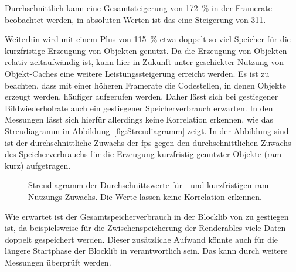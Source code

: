 Durchschnittlich kann eine Gesamtsteigerung von \SI{172}{\percent} in der Framerate beobachtet werden, in absoluten Werten ist das eine Steigerung von \SI{311}{\fps}.

Weiterhin wird mit einem Plus von \SI{115}{\percent} etwa doppelt so viel Speicher für die kurzfristige Erzeugung von Objekten genutzt. Da die Erzeugung von Objekten relativ zeitaufwändig ist, kann hier in Zukunft unter geschickter Nutzung von Objekt-Caches eine weitere Leistungssteigerung erreicht werden. Es ist zu beachten, dass mit einer höheren Framerate die Codestellen, in denen Objekte erzeugt werden, häufiger aufgerufen werden. Daher lässt sich bei gestiegener Bildwiederholrate auch ein gestiegener Speicherverbrauch erwarten. In den Messungen lässt sich hierfür allerdings keine Korrelation erkennen, wie das Streudiagramm in Abbildung~\vref{fig:Streudiagramm} zeigt. In der Abbildung sind ist der durchschnittliche Zuwachs der \ac{fps} gegen den durchschnittlichen Zuwachs des Speicherverbrauchs für die Erzeugung kurzfristig genutzter Objekte (\ac{ram} kurz) aufgetragen. 
\begin{figure}
	\centering
		\caption[Streudiagramm der Durchschnittswerte für - und kurzfristigen -Nutzungs-Zuwachs.]{Streudiagramm der Durchschnittswerte für \si{\fps}- und kurzfristigen \ac{ram}-Nutzungs-Zuwachs. Die Werte lassen keine Korrelation erkennen.}\label{fig:Streudiagramm}
\end{figure}

Wie erwartet ist der Gesamtspeicherverbrauch in der Blocklib von \sysA{} zu \sysB{} gestiegen ist, da beispielsweise für die Zwischenspeicherung der Renderables viele Daten doppelt gespeichert werden. 
Dieser zusätzliche Aufwand könnte auch für die längere Startphase der Blocklib in \sysB{} verantwortlich sein. Das kann durch weitere Messungen überprüft werden.